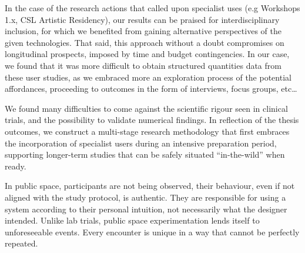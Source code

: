 In the case of the research actions that called upon specialist uses (e.g Workshops 1.x, CSL Artistic Residency), our results can be praised for interdisciplinary inclusion, for which we benefited from gaining alternative perspectives of the given technologies. That said, this approach without a doubt compromises on longitudinal prospects, imposed by time and budget contingencies. In our case, we found that it was more difficult to obtain structured quantities data from these user studies, as we embraced more an exploration process of the potential affordances, proceeding to outcomes in the form of interviews, focus groups, etc…

We found many difficulties to come against the scientific rigour seen in clinical trials, and the possibility to validate numerical findings. In reflection of the thesis outcomes, we construct a multi-stage research methodology that first embraces the incorporation of specialist users during an intensive preparation period, supporting longer-term studies that can be safely situated “in-the-wild” when ready.

In public space, participants are not being observed, their behaviour, even if not aligned with the study protocol, is authentic. They are responsible for using a system according to their personal intuition, not necessarily what the designer intended. Unlike lab trials, public space experimentation lends itself to unforeseeable events. Every encounter is unique in a way that cannot be perfectly repeated. 


